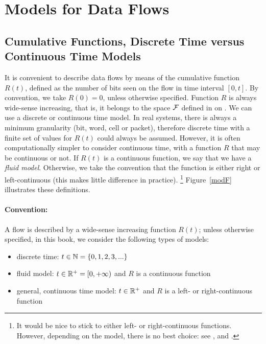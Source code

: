 \section{Models for Data Flows}

\subsection{Cumulative Functions, Discrete Time versus Continuous Time Models}
It is convenient to describe data flows by means of the cumulative
function $R(t)$, defined as the number of bits seen on the flow in
time interval $[0,t]$. By convention, we take $R(0)=0$, unless
otherwise specified. Function $R$ is always wide-sense increasing,
that is, it belongs to the space $\mathcal F$ defined in
 on . We can use a
discrete or continuous time model. In real systems, there is
always a minimum granularity (bit, word, cell or packet),
therefore  discrete time with a finite set of values for $R(t)$
could always be assumed. However, it is often computationally
simpler to consider continuous time, with a function $R$ that may
be continuous or not. If $R(t)$ is a continuous function, we say
that we have a {\em fluid model}. Otherwise, we take the
convention that the function is either right or left-continuous
(this makes little difference in practice).%
\footnote{It would be nice to stick to either left- or
right-continuous functions. However, depending on the model, there
is no best choice: see ,  and .}
Figure~\ref{modF} illustrates these definitions.

\hrulefill
\paragraph{Convention: } A flow is described by a wide-sense
increasing function $R(t)$; unless otherwise specified, in this
book, we consider  the following types of models:
\begin{itemize}
  \item discrete time: $t \in \mathbb{N}=\{0,1,2,3,...\}$
  \item fluid model: $t \in \mathbb{R}^+=[0,+\infty)$ and $R$ is a continuous
  function
  \item general, continuous time model: $t \in \mathbb{R}^+$ and $R$ is
   a left- or right-continuous
  function
\end{itemize}
\hrulefill


